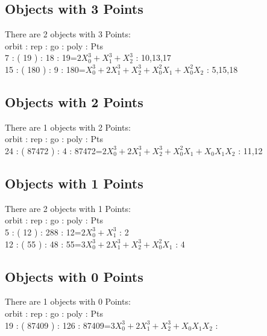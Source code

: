 \subsection*{Objects with 3 Points}
There are 2 objects with 3 Points: \\
orbit : rep : go : poly : Pts\\
7 : ( 19 ) : 18 : 19=$2X_0^3 + X_1^3 + X_2^3$ : 10,13,17\\
15 : ( 180 ) : 9 : 180=$X_0^3 + 2X_1^3 + X_2^3 + X_0^2X_1 + X_0^2X_2$ : 5,15,18\\
\subsection*{Objects with 2 Points}
There are 1 objects with 2 Points: \\
orbit : rep : go : poly : Pts\\
24 : ( 87472 ) : 4 : 87472=$2X_0^3 + 2X_1^3 + X_2^3 + X_0^2X_1 + X_0X_1X_2$ : 11,12\\
\subsection*{Objects with 1 Points}
There are 2 objects with 1 Points: \\
orbit : rep : go : poly : Pts\\
5 : ( 12 ) : 288 : 12=$2X_0^3 + X_1^3$ : 2\\
12 : ( 55 ) : 48 : 55=$3X_0^3 + 2X_1^3 + X_2^3 + X_0^2X_1$ : 4\\
\subsection*{Objects with 0 Points}
There are 1 objects with 0 Points: \\
orbit : rep : go : poly : Pts\\
19 : ( 87409 ) : 126 : 87409=$3X_0^3 + 2X_1^3 + X_2^3 + X_0X_1X_2$ : \\
